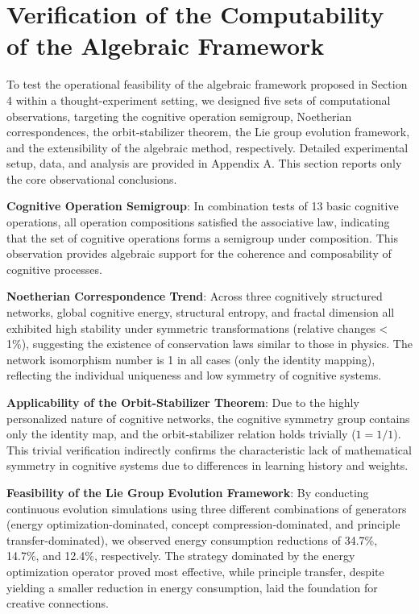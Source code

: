 \documentclass[10pt,onecolumn]{article}
\begin{document}
\section{Verification of the Computability of the Algebraic Framework}
\label{sec:algebraic_experiments}

To test the operational feasibility of the algebraic framework proposed in Section 4 within a thought-experiment setting, we designed five sets of computational observations, targeting the cognitive operation semigroup, Noetherian correspondences, the orbit-stabilizer theorem, the Lie group evolution framework, and the extensibility of the algebraic method, respectively. Detailed experimental setup, data, and analysis are provided in Appendix A. This section reports only the core observational conclusions.

\textbf{Cognitive Operation Semigroup}: In combination tests of 13 basic cognitive operations, all operation compositions satisfied the associative law, indicating that the set of cognitive operations forms a semigroup under composition. This observation provides algebraic support for the coherence and composability of cognitive processes.

\textbf{Noetherian Correspondence Trend}: Across three cognitively structured networks, global cognitive energy, structural entropy, and fractal dimension all exhibited high stability under symmetric transformations (relative changes < 1\%), suggesting the existence of conservation laws similar to those in physics. The network isomorphism number is 1 in all cases (only the identity mapping), reflecting the individual uniqueness and low symmetry of cognitive systems.

\textbf{Applicability of the Orbit-Stabilizer Theorem}: Due to the highly personalized nature of cognitive networks, the cognitive symmetry group contains only the identity map, and the orbit-stabilizer relation holds trivially ($1 = 1/1$). This trivial verification indirectly confirms the characteristic lack of mathematical symmetry in cognitive systems due to differences in learning history and weights.

\textbf{Feasibility of the Lie Group Evolution Framework}: By conducting continuous evolution simulations using three different combinations of generators (energy optimization-dominated, concept compression-dominated, and principle transfer-dominated), we observed energy consumption reductions of 34.7\%, 14.7\%, and 12.4\%, respectively. The strategy dominated by the energy optimization operator proved most effective, while principle transfer, despite yielding a smaller reduction in energy consumption, laid the foundation for creative connections.
\end{document}
